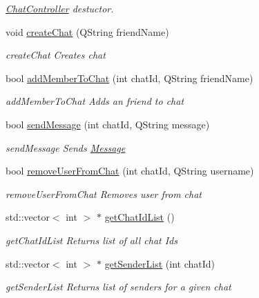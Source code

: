 \begin{DoxyCompactItemize}
\begin{DoxyCompactList}\small\item\em \hyperlink{classChatController}{Chat\+Controller} destuctor. \end{DoxyCompactList}\item 
void \hyperlink{classChatController_a05caa5931a7bb7ee842527b8ed2ccbfa}{create\+Chat} (Q\+String friend\+Name)
\begin{DoxyCompactList}\small\item\em create\+Chat Creates chat \end{DoxyCompactList}\item 
bool \hyperlink{classChatController_aec8d6878e62e56da3a77cd67ad9dae63}{add\+Member\+To\+Chat} (int chat\+Id, Q\+String friend\+Name)
\begin{DoxyCompactList}\small\item\em add\+Member\+To\+Chat Adds an friend to chat \end{DoxyCompactList}\item 
bool \hyperlink{classChatController_a75c28b7fd66e0ca1079de48925e4974d}{send\+Message} (int chat\+Id, Q\+String message)
\begin{DoxyCompactList}\small\item\em send\+Message Sends \hyperlink{classMessage}{Message} \end{DoxyCompactList}\item 
bool \hyperlink{classChatController_a00a6dee4d7fed8f1b3c4e11c4c9dd320}{remove\+User\+From\+Chat} (int chat\+Id, Q\+String username)
\begin{DoxyCompactList}\small\item\em remove\+User\+From\+Chat Removes user from chat \end{DoxyCompactList}\item 
std\+::vector$<$ int $>$ $\ast$ \hyperlink{classChatController_a212e267ddbb3bb1a55f40666ba8d2cd9}{get\+Chat\+Id\+List} ()
\begin{DoxyCompactList}\small\item\em get\+Chat\+Id\+List Returns list of all chat Ids \end{DoxyCompactList}\item 
std\+::vector$<$ int $>$ $\ast$ \hyperlink{classChatController_a131472bde027f72f19a52fba9c735aeb}{get\+Sender\+List} (int chat\+Id)
\begin{DoxyCompactList}\small\item\em get\+Sender\+List Returns list of senders for a given chat \end{DoxyCompactList}\item 

\end{DoxyCompactItemize}
